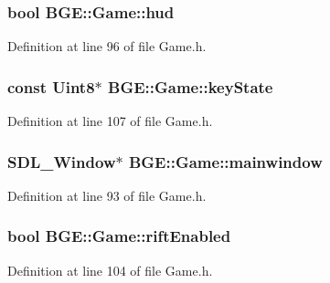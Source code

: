 \hypertarget{class_b_g_e_1_1_game_aa7754d7d3f8b64ee1de1a540b32e83b1}{
\subsubsection[{hud}]{\setlength{\rightskip}{0pt plus 5cm}bool B\-G\-E\-::\-Game\-::hud}}\label{class_b_g_e_1_1_game_aa7754d7d3f8b64ee1de1a540b32e83b1}


Definition at line 96 of file Game.\-h.

\hypertarget{class_b_g_e_1_1_game_a9e0095e531e23c2b3368d76ef341ddd9}{
\subsubsection[{key\-State}]{\setlength{\rightskip}{0pt plus 5cm}const Uint8$\ast$ B\-G\-E\-::\-Game\-::key\-State}}\label{class_b_g_e_1_1_game_a9e0095e531e23c2b3368d76ef341ddd9}


Definition at line 107 of file Game.\-h.

\hypertarget{class_b_g_e_1_1_game_a7d79db52e4ae135f72ac7d7e79b5fd89}{
\subsubsection[{mainwindow}]{\setlength{\rightskip}{0pt plus 5cm}S\-D\-L\-\_\-\-Window$\ast$ B\-G\-E\-::\-Game\-::mainwindow}}\label{class_b_g_e_1_1_game_a7d79db52e4ae135f72ac7d7e79b5fd89}


Definition at line 93 of file Game.\-h.

\hypertarget{class_b_g_e_1_1_game_a9c97f2f28873bab23b8b295961cf6ac6}{
\subsubsection[{rift\-Enabled}]{\setlength{\rightskip}{0pt plus 5cm}bool B\-G\-E\-::\-Game\-::rift\-Enabled}}\label{class_b_g_e_1_1_game_a9c97f2f28873bab23b8b295961cf6ac6}


Definition at line 104 of file Game.\-h.

